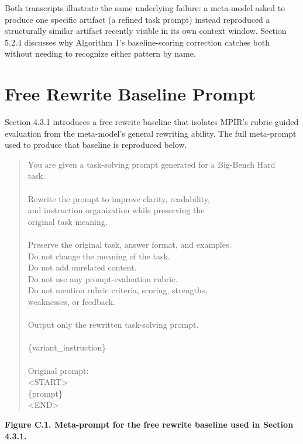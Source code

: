 \documentclass[a4paper,fleqn]{cas-sc}
\begin{document}
Both transcripts illustrate the same underlying failure: a meta-model asked to produce one specific artifact (a refined task prompt) instead reproduced a structurally similar artifact recently visible in its own context window. Section 5.2.4 discusses why Algorithm 1's baseline-scoring correction catches both without needing to recognize either pattern by name.

\section{Free Rewrite Baseline Prompt}

Section 4.3.1 introduces a free rewrite baseline that isolates MPIR's rubric-guided evaluation from the meta-model's general rewriting ability. The full meta-prompt used to produce that baseline is reproduced below.

\centering
\begin{quote}\ttfamily\small
You are given a task-solving prompt generated for a Big-Bench Hard\\{}
task.\\{}
~\\{}
Rewrite the prompt to improve clarity, readability,\\{}
and instruction organization while preserving the\\{}
original task meaning.\\{}
~\\{}
Preserve the original task, answer format, and examples.\\{}
Do not change the meaning of the task.\\{}
Do not add unrelated content.\\{}
Do not use any prompt-evaluation rubric.\\{}
Do not mention rubric criteria, scoring, strengths,\\{}
weaknesses, or feedback.\\{}
~\\{}
Output only the rewritten task-solving prompt.\\{}
~\\{}
\{variant\_\allowbreak{}instruction\}\\{}
~\\{}
Original prompt:\\{}
<START>\\{}
\{prompt\}\\{}
<END>\\{}
\end{quote}
\par\noindent\textbf{Figure C.1. Meta-prompt for the free rewrite baseline used in Section 4.3.1.}
\end{document}
